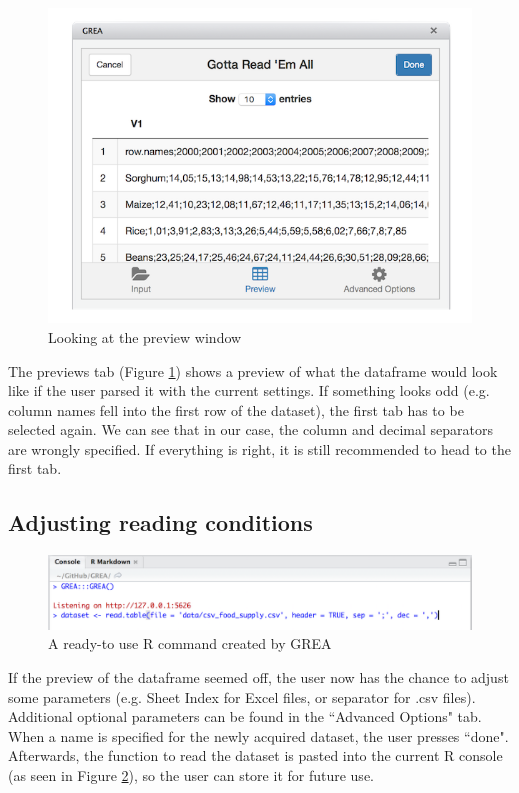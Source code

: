 \documentclass[12pt]{article} %
\begin{document}
\begin{figure}
\center
\includegraphics{figures/step2.png}
\caption{Looking at the preview window}
\label{steptwo}
\end{figure}

The previews tab (Figure \ref{steptwo}) shows a preview of what the dataframe would look like if the user parsed it with the current settings. If something looks odd (e.g. column names fell into the first row of the dataset), the first tab has to be selected again. We can see that in our case, the column and decimal separators are wrongly specified. If everything is right, it is still recommended to head to the first tab.

\subsection{Adjusting reading conditions}

\begin{figure}
\center
\includegraphics[scale = 0.8]{figures/step3.png}
\caption{A ready-to use R command created by GREA}
\label{stepthree}
\end{figure}

If the preview of the dataframe seemed off, the user now has the chance to adjust some parameters (e.g. Sheet Index for Excel files, or separator for .csv files). Additional optional parameters can be found in the ``Advanced Options" tab. When a name is specified for the newly acquired dataset, the user presses ``done". Afterwards, the function to read the dataset is pasted into the current R console (as seen in Figure \ref{stepthree}), so the user can store it for future use.
\end{document}
